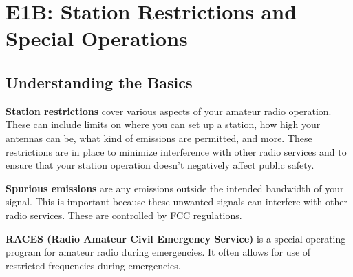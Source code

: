 \section{E1B: Station Restrictions and Special Operations}

\subsection*{Understanding the Basics}
  \textcolor{myblue}{\textbf{Station restrictions}} cover various aspects of your amateur radio operation. These can include limits on where you can set up a station, how high your antennas can be, what kind of emissions are permitted, and more. These restrictions are in place to minimize interference with other radio services and to ensure that your station operation doesn't negatively affect public safety.
  \par
  \textcolor{myblue}{\textbf{Spurious emissions}} are any emissions outside the intended bandwidth of your signal. This is important because these unwanted signals can interfere with other radio services. These are controlled by FCC regulations.
  \par
  \textcolor{myblue}{\textbf{RACES (Radio Amateur Civil Emergency Service)}} is a special operating program for amateur radio during emergencies. It often allows for use of restricted frequencies during emergencies. 

